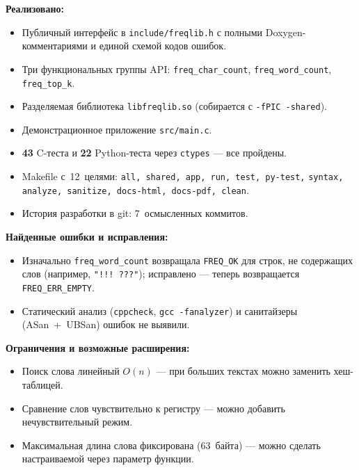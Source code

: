 \medskip
\noindent\textbf{Реализовано:}
\begin{itemize}
    \item Публичный интерфейс в \texttt{include/freqlib.h}
          с полными Doxygen-комментариями и единой схемой кодов ошибок.
    \item Три функциональных группы API:
          \texttt{freq\_char\_count}, \texttt{freq\_word\_count},
          \texttt{freq\_top\_k}.
    \item Разделяемая библиотека \texttt{libfreqlib.so}
          (собирается с \texttt{-fPIC -shared}).
    \item Демонстрационное приложение \texttt{src/main.c}.
    \item \textbf{43} C-теста и \textbf{22} Python-теста через
          \texttt{ctypes} --- все пройдены.
    \item Makefile с~12~целями:
          \texttt{all, shared, app, run, test, py-test,}
          \texttt{syntax, analyze, sanitize, docs-html, docs-pdf, clean}.
    \item История разработки в git: 7~осмысленных коммитов.
\end{itemize}

\medskip
\noindent\textbf{Найденные ошибки и исправления:}
\begin{itemize}
    \item Изначально \texttt{freq\_word\_count} возвращала \texttt{FREQ\_OK}
          для строк, не содержащих слов (например, \texttt{"!!! ???"}); 
          исправлено --- теперь возвращается \texttt{FREQ\_ERR\_EMPTY}.
    \item Статический анализ (\texttt{cppcheck}, \texttt{gcc~-fanalyzer})
          и санитайзеры (ASan~+~UBSan) ошибок не выявили.
\end{itemize}

\medskip
\noindent\textbf{Ограничения и возможные расширения:}
\begin{itemize}
    \item Поиск слова линейный $O(n)$ --- при больших текстах
          можно заменить хеш-таблицей.
    \item Сравнение слов чувствительно к регистру ---
          можно добавить нечувствительный режим.
    \item Максимальная длина слова фиксирована (63~байта) ---
          можно сделать настраиваемой через параметр функции.
\end{itemize}
